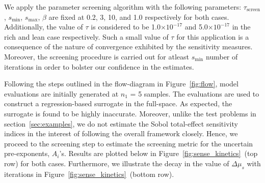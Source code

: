 We apply the parameter screening algorithm with the following
parameters: $\tau_\text{screen}$, $s_\text{min}$,
$s_\text{max}$, $\beta$ are fixed at 0.2, 3, 10, and 1.0 respectively for both cases.
Additionally, the value of $\tau$ is considered to be 1.0$\times 10^{-17}$ and
5.0$\times 10^{-17}$ in the rich and lean case respectively. Such a small value
of $\tau$ for this application is a consequence of the nature of convergence exhibited
by the sensitivity measures. Moreover, the screening procedure is carried out
for atleast $s_\text{min}$ number of iterations in order to bolster our confidence
in the estimates. 

Following the steps outlined in the flow-diagram in Figure~\ref{fig:flow}, model
evaluations are initially generated at $n_1$ = 5 samples. The evaluations are
used to construct a regression-based surrogate in the full-space. As
expected, the surrogate is found to be highly inaccurate. Moreover, unlike the
test problems in section~\ref{sec:examples}, we do not estimate the Sobol
total-effect sensitivity indices in the interest of following the overall framework
closely. Hence, we proceed to the screening step to estimate the screening metric
for the uncertain pre-exponents, $A_i$'s. Results are plotted below
in Figure~\ref{fig:sense_kinetics}~(top row) for both cases. Furthermore, we illustrate
the decay in the value of $\Delta\mu_s$ with iterations in 
Figure~\ref{fig:sense_kinetics}~(bottom row). 

